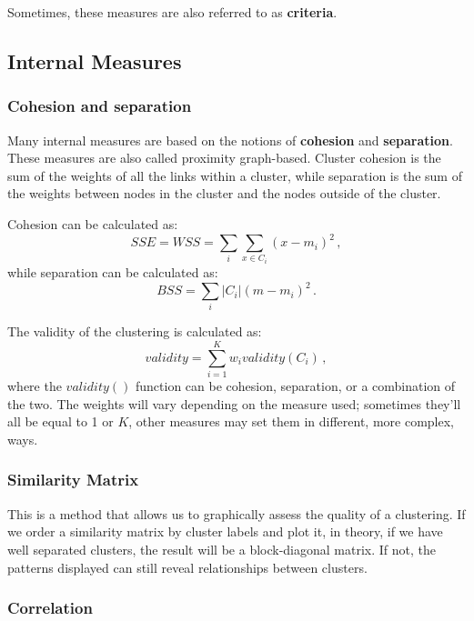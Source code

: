 Sometimes, these measures are also referred to as \textbf{criteria}.

\subsection{Internal Measures}

\subsubsection{Cohesion and separation}

Many internal measures are based on the notions of \textbf{cohesion} and \textbf{separation}. These measures are also called proximity graph-based. Cluster cohesion is the sum of the weights of all the links within a cluster, while separation is the sum of the weights between nodes in the cluster and the nodes outside of the cluster.

Cohesion can be calculated as:
\begin{equation*}
    SSE = WSS = \sum_i \sum_{x \in C_i} (x-m_i)^2 \, ,
\end{equation*}
while separation can be calculated as:
\begin{equation*}
    BSS = \sum _i |C_i|(m-m_i)^2 \, .
\end{equation*}

The validity of the clustering is calculated as:
\begin{equation*}
    validity = \sum_{i=1}^K w_i validity(C_i) \, ,
\end{equation*}
where the $validity()$ function can be cohesion, separation, or a combination of the two. The weights will vary depending on the measure used; sometimes they'll all be equal to 1 or $K$, other measures may set them in different, more complex, ways.

\subsubsection{Similarity Matrix}

This is a method that allows us to graphically assess the quality of a clustering. If we order a similarity matrix by cluster labels and plot it, in theory, if we have well separated clusters, the result will be a block-diagonal matrix. If not, the patterns displayed can still reveal relationships between clusters.

\subsubsection{Correlation}

